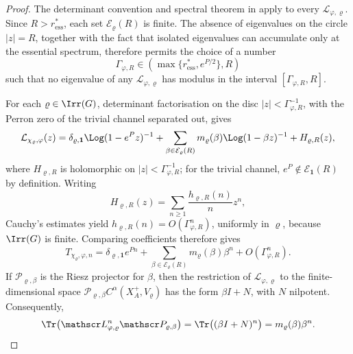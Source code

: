 \begin{proof}
  The determinant convention and spectral theorem in
   apply to every
  \(\mathscr L_{\varphi,\varrho}\).
  Since \(R>r_{\mathrm{ess}}^\ast\), each set
  \(\mathcal E_\varrho(R)\) is finite. The absence of eigenvalues on
  the circle \(|z|=R\), together with the fact that isolated
  eigenvalues can accumulate only at the essential spectrum, therefore
  permits the choice of a number
  \[
    \Gamma_{\varphi,R}\in(\max\{r_{\mathrm{ess}}^\ast,e^{P/2}\},R)
  \]
  such that no eigenvalue of any \(\mathscr L_{\varphi,\varrho}\) has
  modulus in the interval \([\Gamma_{\varphi,R},R]\).

  For each \(\varrho\in\Irr(G)\), determinant factorisation on the disc
  \(|z|<\Gamma_{\varphi,R}^{-1}\), with the Perron zero of the trivial
  channel separated out, gives
  \[
    \mathcal L_{\chi_\varrho,\varphi}(z)
    =
    \delta_{\varrho,\mathbf 1}\Log(1-e^Pz)^{-1}
    +
    \sum_{\beta\in\mathcal E_\varrho(R)}
      m_\varrho(\beta)\Log(1-\beta z)^{-1}
    +H_{\varrho,R}(z),
  \]
  where \(H_{\varrho,R}\) is holomorphic on
  \(|z|<\Gamma_{\varphi,R}^{-1}\); for the trivial channel,
  \(e^P\notin\mathcal E_{\mathbf 1}(R)\) by definition. Writing
  \[
    H_{\varrho,R}(z)=\sum_{n\ge 1}\frac{h_{\varrho,R}(n)}{n}z^n,
  \]
  Cauchy's estimates yield \(h_{\varrho,R}(n)=O(\Gamma_{\varphi,R}^n)\),
  uniformly in \(\varrho\), because \(\Irr(G)\) is finite. Comparing
  coefficients therefore gives
  \begin{equation}\label{eq:holder-transfer-spectral-window-traces}
    T_{\chi_\varrho,\varphi,n}
    =
    \delta_{\varrho,\mathbf 1}e^{Pn}
    +
    \sum_{\beta\in\mathcal E_\varrho(R)}
      m_\varrho(\beta)\beta^n
    +O(\Gamma_{\varphi,R}^n).
  \end{equation}
  If \(\mathscr P_{\varrho,\beta}\) is the Riesz projector for
  \(\beta\), then the restriction of \(\mathscr L_{\varphi,\varrho}\)
  to the finite-dimensional space
  \(\mathscr P_{\varrho,\beta}C^\alpha(X_A^+,V_\varrho)\) has the form
  \(\beta I+N\), with \(N\) nilpotent. Consequently,
  \[
    \Tr\bigl(\mathscr L_{\varphi,\varrho}^n\mathscr P_{\varrho,\beta}\bigr)
    =
    \Tr\bigl((\beta I+N)^n\bigr)
    =m_\varrho(\beta)\beta^n.
  \]


\end{proof}
